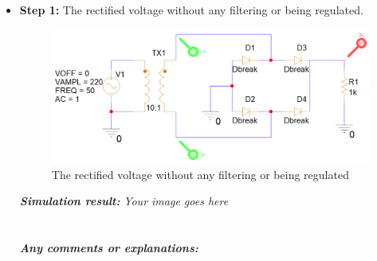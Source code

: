 \begin{itemize}
    \item \textbf{Step 1:} The rectified voltage without any filtering or being regulated.
          \begin{figure}[H]
              \centering
              \includegraphics[width=\linewidth]{source/content/lab2_ex9_step1.png}
              \caption{The rectified voltage without any filtering or being regulated}
              \label{lab2_ex9_step1}
          \end{figure}
          \textit{\textbf{Simulation result:}} \textit{Your image goes here}\\
          \\
          \vspace{8cm}
          \\
          \textbf{\textit{Any comments or explanations:}}
          \dotfill\bigskip\par\mbox{}\dotfill
          \dotfill\bigskip\par\mbox{}\dotfill
          \dotfill\bigskip\par\mbox{}\dotfill
          \dotfill\bigskip\par\mbox{}\dotfill
          \dotfill\bigskip\par\mbox{}\dotfill
          \dotfill\bigskip\par\mbox{}\dotfill


\end{itemize}
